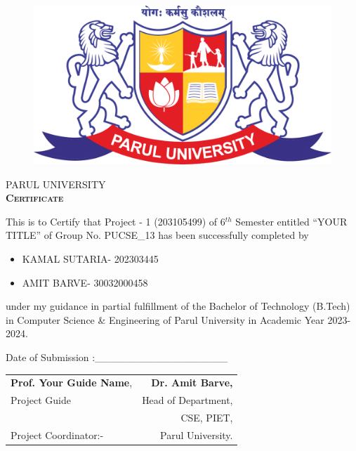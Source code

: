 \thispagestyle{plain}
\begin{figure}
    \centering
    \includegraphics[scale=0.15]{parullogo.png}
    \end{figure}
\vspace{1.5cm}
\begin{center}
    {\Huge \textsc{\color{violet}PARUL UNIVERSITY}}\\
   
    \vspace{1cm}
     {\Huge \bf \textsc{\color{teal}Certificate}}\\
     \vspace{0.5cm}
     \end{center}
     \large{This is to Certify that Project - 1 (203105499) of 6$^{th}$ Semester entitled “YOUR TITLE” of Group No. PUCSE\_13 has been successfully completed by}
     \begin{itemize}
     \centering
         \item KAMAL SUTARIA- 202303445
         \item AMIT BARVE- 30032000458
     \end{itemize}
         
     \noindent
    \large {under my guidance in partial fulfillment of the Bachelor of Technology (B.Tech) in Computer Science \& Engineering of Parul University in Academic Year 2023- 2024.}\\ \par
   \vspace{0.5cm}
    Date of Submission :\_\_\_\_\_\_\_\_\_\_\_\_\_\_\_\_\_\_
   
   \vspace{2.5cm}
   \begin{tabular}{l r}
   \color{brown}
      \textbf{Prof. Your Guide Name}, & \hspace{4cm} \color{brown}\textbf{Dr. Amit Barve,}  \\ 
      Project Guide & Head of Department,  \\  &  CSE, PIET,\\
      Project Coordinator:-
      & Parul University.\\ [7ex]  
   \end{tabular}
   
   
